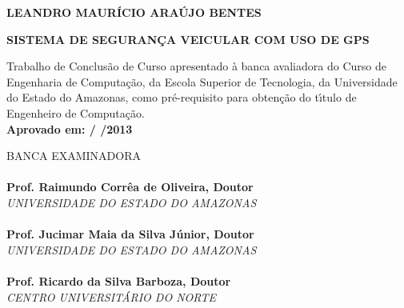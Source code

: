 \documentclass{dcctese}
\begin{document}
\newpage


\begin{center}
\bf LEANDRO MAUR\'{I}CIO ARA\'{U}JO BENTES\\[1.5 cm]
\end{center}

\begin{center}
\bf SISTEMA DE SEGURAN\c{C}A VEICULAR COM USO DE GPS\\[1.5cm]
\end{center}

\hspace*{8cm}
\begin{minipage}{8cm} 

Trabalho de Conclus\~{a}o de Curso apresentado \`{a} 
banca avaliadora do Curso de Engenharia de Computa\c{c}\~{a}o, 
da Escola Superior de Tecnologia, da Universidade do Estado do Amazonas, 
como pr\'e-requisito para obten\c{c}\~{a}o do t\'{\i}tulo de 
Engenheiro de Computa\c{c}\~{a}o.\\

\large \bf Aprovado em:  /  /2013
\end{minipage} 

BANCA EXAMINADORA\\[12 pt]

\noindent \hrulefill \hspace*{6cm} \\
\noindent \textbf{Prof. Raimundo Corr\^{e}a de Oliveira, Doutor}\\
\textit{UNIVERSIDADE DO ESTADO DO AMAZONAS}\\[0.5cm]

\noindent \hrulefill \hspace*{6cm} \\
\noindent \textbf{Prof. Jucimar Maia da Silva J\'{u}nior, Doutor}\\
\textit{UNIVERSIDADE DO ESTADO DO AMAZONAS}\\[0.5cm]

\noindent \hrulefill \hspace*{6cm} \\
\noindent \textbf{Prof. Ricardo da Silva Barboza, Doutor}\\
\textit{CENTRO UNIVERSIT\'{A}RIO DO NORTE}\\

\newpage
\end{document}
